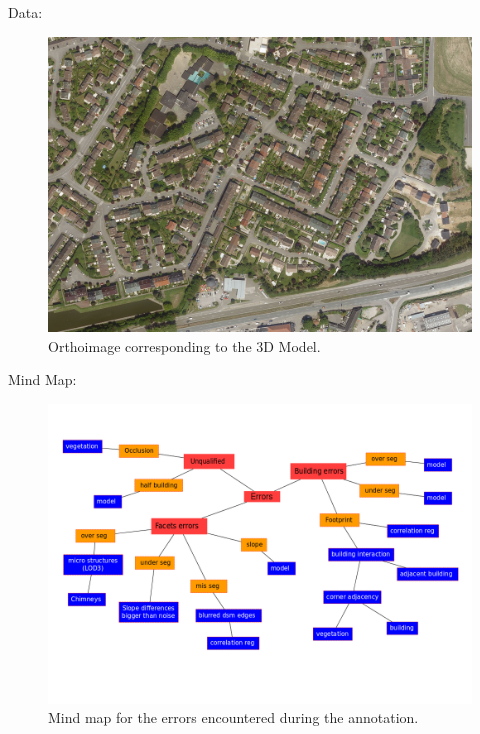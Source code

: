 \documentclass[9pt]{beamer}
\begin{document}
	\begin{frame}{Data:}
		\begin{figure}
			\begin{center}
				\caption{\label{img::ortho} Orthoimage corresponding to the 3D Model.}
				\includegraphics[scale=.08]{orthoimage.jpg}
			\end{center}
		\end{figure}
	\end{frame}
	
	\begin{frame}{Mind Map:}
		\begin{figure}
			\begin{center}
				\caption{\label{img::mind_map} Mind map for the errors encountered during the annotation.}
				\includegraphics[scale=.25]{heuristic.png}
			\end{center}
		\end{figure}
	\end{frame}
\end{document}
